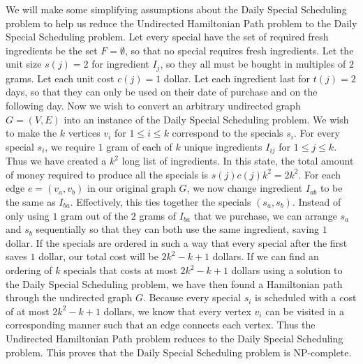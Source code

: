 \documentclass[12pt]{article}
\begin{document}
We will make some simplifying assumptions about the Daily Special Scheduling problem to help us reduce the Undirected Hamiltonian Path problem
to the Daily Special Scheduling problem. Let every special have the set of required fresh ingredients be the set \(F=\emptyset\),
so that no special requires fresh ingredients. Let the unit size \(s(j)=2\) for ingredient \(I_j\), so they all must be bought in multiples
of \(2\) grams. Let each unit cost \(c(j)=1\) dollar. Let each ingredient last for \(t(j)=2\) days, so that they can only be used on their
date of purchase and on the following day. Now we wish to convert an arbitrary undirected graph \(G=(V,E)\) into an instance of the Daily
Special Scheduling problem. We wish to make the \(k\) vertices \(v_i\) for \(1\leq i\leq k\) correspond to the specials \(s_i\). For every
special \(s_i\), we require \(1\) gram of each of \(k\) unique ingredients \(I_{ij}\) for \(1\leq j\leq k\). Thus we have created a \(k^2\) long
list of ingredients. In this state, the total amount of money required to produce all the specials is \(s(j)c(j)k^2=2k^2\). For each edge
\(e=(v_a,v_b)\) in our original graph \(G\), we now change ingredient \(I_{ab}\) to be the same as \(I_{ba}\). Effectively, this ties together
the specials \((s_a,s_b)\). Instead of only using \(1\) gram out of the \(2\) grams of \(I_{ba}\) that we purchase, we can arrange \(s_a\) and
\(s_b\) sequentially so that they can both use the same ingredient, saving \(1\) dollar. If the specials are ordered in such a way that every
special after the first saves \(1\) dollar, our total cost will be \(2k^2-k+1\) dollars. If we can find an ordering of \(k\) specials that costs
at most \(2k^2-k+1\) dollars using a solution to the Daily Special Scheduling problem, we have then found a Hamiltonian path through the undirected
graph \(G\). Because every special \(s_i\) is scheduled with a cost of at most \(2k^2-k+1\) dollars, we know that every vertex \(v_i\) can be visited
in a corresponding manner such that an edge connects each vertex. Thus the Undirected Hamiltonian Path problem reduces to the Daily Special Scheduling
problem. This proves that the Daily Special Scheduling problem is NP-complete.
\end{document}
